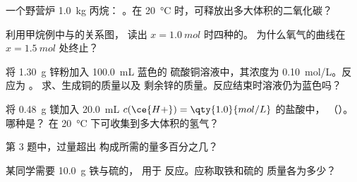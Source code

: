 \begin{exercise}[$\star\star$]\label{exo:g10:reaction-progress-table:7}
一个野营炉 \qty{1.0}{kg} 丙烷：
。在
\qty{20}{\celsius} 时，可释放出多大体积的二氧化碳？
\end{exercise}

\begin{exercise}[$\star\star$]\label{exo:g10:reaction-progress-table:8}
利用甲烷例中与的关系图，
读出 $x = \qty{1.0}{mol}$ 时四种的。
为什么氧气的曲线在 $x = \qty{1.5}{mol}$ 处终止？
\end{exercise}

\begin{exercise}[$\star\star$]\label{exo:g10:reaction-progress-table:9}
将 \qty{1.30}{g} 锌粉加入 \qty{100.0}{mL} 蓝色的
硫酸铜溶液中，其浓度为 \qty{0.10}{mol/L}。反应为
。
求、生成铜的质量以及
剩余锌的质量。反应结束时溶液仍为蓝色吗？
\end{exercise}

\begin{exercise}[$\star\star$]\label{exo:g10:reaction-progress-table:10}
将 \qty{0.48}{g} 镁加入 \qty{20.0}{mL}
$c(\ce{H+}) = \qty{1.0}{mol/L}$ 的盐酸中，
（）。哪种是？
在 \qty{20}{\celsius} 下可收集到多大体积的氢气？
\end{exercise}

\begin{exercise}[$\star\star$]\label{exo:g10:reaction-progress-table:11}
第 3 题中，过量超出
构成所需的量多百分之几？
\end{exercise}

\begin{exercise}[$\star\star\star$]\label{exo:g10:reaction-progress-table:12}
某同学需要 \qty{10.0}{g} 铁与硫的，
用于  反应。应称取铁和硫的
质量各为多少？
\end{exercise}

